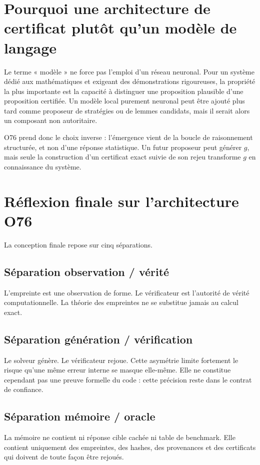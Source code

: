 \documentclass[11pt,a4paper]{article}
\begin{document}
\section{Pourquoi une architecture de certificat plutôt qu'un modèle de langage}
Le terme « modèle » ne force pas l'emploi d'un réseau neuronal. Pour un système dédié aux mathématiques et exigeant des démonstrations rigoureuses, la propriété la plus importante est la capacité à distinguer une proposition plausible d'une proposition certifiée. Un modèle local purement neuronal peut être ajouté plus tard comme proposeur de stratégies ou de lemmes candidats, mais il serait alors un composant non autoritaire.

O76 prend donc le choix inverse : l'émergence vient de la boucle de raisonnement structurée, et non d'une réponse statistique. Un futur proposeur peut générer $g$, mais seule la construction d'un certificat exact suivie de son rejeu transforme $g$ en connaissance du système.

\section{Réflexion finale sur l'architecture O76}
La conception finale repose sur cinq séparations.

\subsection{Séparation observation / vérité}
L'empreinte est une observation de forme. Le vérificateur est l'autorité de vérité computationnelle. La théorie des empreintes ne se substitue jamais au calcul exact.

\subsection{Séparation génération / vérification}
Le solveur génère. Le vérificateur rejoue. Cette asymétrie limite fortement le risque qu'une même erreur interne se masque elle-même. Elle ne constitue cependant pas une preuve formelle du code : cette précision reste dans le contrat de confiance.

\subsection{Séparation mémoire / oracle}
La mémoire ne contient ni réponse cible cachée ni table de benchmark. Elle contient uniquement des empreintes, des hashes, des provenances et des certificats qui doivent de toute façon être rejoués.
\end{document}
